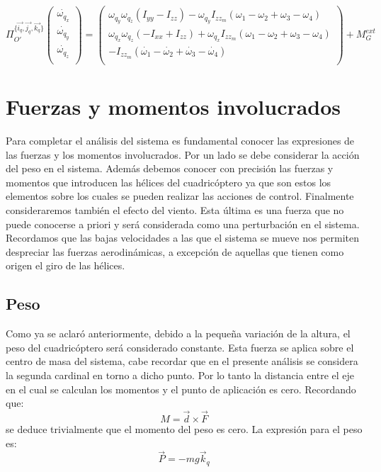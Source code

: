 \documentclass[main]{subfiles}
\begin{document}
\begin{equation}
 \Pi_{O\prime}^{\{\vec{i_q}, \vec{j_q}, \vec{k_q}\}}\left(\begin{array}{c}
\dot{\omega_{q_x}}\\
\dot{\omega_{q_y}}\\
\dot{\omega_{q_z}}\\
\end{array}\right) = \left(\begin{array}{c}
\omega_{q_y}\omega_{q_z}(I_{yy}-I_{zz})-\omega_{q_y}I_{zz_m}(\omega_1-\omega_2+\omega_3-\omega_4)\\

\omega_{q_x}\omega_{q_z}(-I_{xx}+I_{zz})+\omega_{q_x}I_{zz_m}(\omega_1-\omega_2+\omega_3-\omega_4)\\

-I_{zz_m}(\dot{\omega_1}-\dot{\omega_2}+\dot{\omega_3}-\dot{\omega_4})\\

\end{array}\right) + M_G^{ext}
\label{eq:omegas}
\end{equation}


\section{Fuerzas y momentos involucrados}
\label{FYT}

Para completar el an\'alisis del sistema es fundamental conocer las expresiones de las fuerzas y los momentos involucrados. Por un lado se debe considerar la acci\'on del peso en el sistema. Adem\'as debemos conocer con precisi\'on las fuerzas y momentos que introducen las h\'elices del cuadric\'optero ya que son estos los elementos sobre los cuales se pueden realizar las acciones de control. Finalmente consideraremos tambi\'en el efecto del viento. Esta \'ultima es una fuerza que no puede conocerse a priori y ser\'a considerada como una perturbaci\'on en el sistema. Recordamos que las bajas velocidades a las que el sistema se mueve nos permiten despreciar las fuerzas aerodin\'amicas, a excepci\'on de aquellas que tienen como origen el giro de las h\'elices.
\subsection{Peso}
Como ya se aclar\'o anteriormente, debido a la peque\~na variaci\'on de la altura, el peso del cuadric\'optero ser\'a considerado constante. Esta fuerza se aplica sobre el centro de masa del sistema, cabe recordar que en el presente an\'alisis se considera la segunda cardinal en torno a dicho punto. Por lo tanto la distancia entre el eje en el cual se calculan los momentos y el punto de aplicaci\'on es cero. Recordando que: $$
M=\vec{d}\times\vec{F}
$$
se deduce trivialmente que el momento del peso es cero. La expresi\'on para el peso es:
$$
\vec{P}=-mg\vec{k}_q
$$
\end{document}

